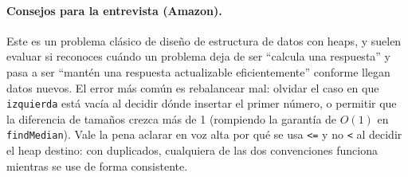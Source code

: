 \paragraph{Consejos para la entrevista (Amazon).} Este es un problema
clásico de diseño de estructura de datos con heaps, y suelen evaluar si
reconoces cuándo un problema deja de ser ``calcula una respuesta'' y pasa a
ser ``mantén una respuesta actualizable eficientemente'' conforme llegan
datos nuevos. El error más común es rebalancear mal: olvidar el caso en que
\texttt{izquierda} está vacía al decidir dónde insertar el primer número, o
permitir que la diferencia de tamaños crezca más de 1 (rompiendo la
garantía de $O(1)$ en \texttt{findMedian}). Vale la pena aclarar en voz alta
por qué se usa \texttt{<=} y no \texttt{<} al decidir el heap destino: con
duplicados, cualquiera de las dos convenciones funciona mientras se use de
forma consistente.
